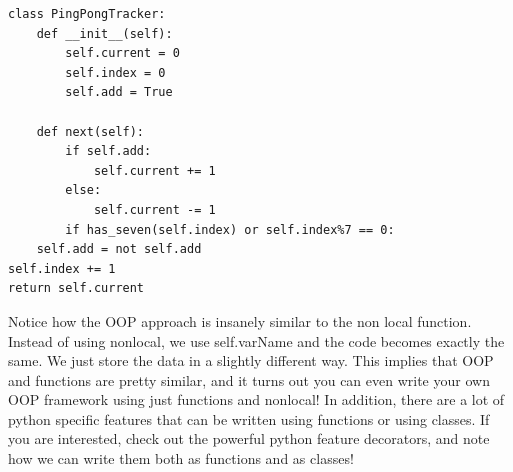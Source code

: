 \documentclass{exam}
\begin{document}
\begin{questions}
\begin{blocksection}
\begin{solution}[0.3in]
\begin{lstlisting}
class PingPongTracker:
	def __init__(self):
		self.current = 0
		self.index = 0
		self.add = True
	
	def next(self):
		if self.add:
			self.current += 1
		else:
			self.current -= 1
		if has_seven(self.index) or self.index%7 == 0:
	self.add = not self.add
self.index += 1
return self.current
\end{lstlisting}
Notice how the OOP approach is insanely similar to the non local function. Instead of using nonlocal, we use self.varName and the code becomes exactly the same. We just store the data in a slightly different way. This implies that OOP and functions are pretty similar, and it turns out you can even write your own OOP framework using just functions and nonlocal!  \newline
\newline
In addition, there are a lot of python specific features that can be written using functions or using classes. If you are interested, check out the powerful python feature decorators, and note how we can write them both as functions and as classes!
\end{solution}

\end{blocksection}

\end{questions}

\end{document}
